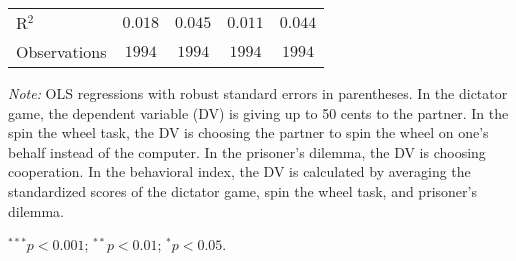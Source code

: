 \begin{table}[!ht]
\begin{center}
{\begin{threeparttable}
\begin{tabular}{l c c c c}
R$^2$                                            & $0.018$        & $0.045$        & $0.011$        & $0.044$        \\
Observations                                     & $1994$         & $1994$         & $1994$         & $1994$         \\
\bottomrule
\end{tabular}
\begin{tablenotes}[flushleft]
\scriptsize{\item[\hspace{-5mm}] \textit{Note:} OLS regressions with robust standard errors in parentheses. 
                                In the dictator game, the dependent variable (DV) is giving up to 50 cents to the partner. 
                                In the spin the wheel task, the DV is choosing the partner to spin the wheel on one’s behalf instead of the computer. 
                                In the prisoner’s dilemma, the DV is choosing cooperation. 
                                In the behavioral index, the DV is calculated by averaging the standardized scores of the dictator game, spin the wheel task, and prisoner's dilemma. \item[\hspace{-5mm}] $^{***}p<0.001$; $^{**}p<0.01$; $^{*}p<0.05$.}
\end{tablenotes}
\end{threeparttable}
}
\label{tab:behavior_regression}
\end{center}
\end{table}

\renewcommand{\baselinestretch}{1.67}%
